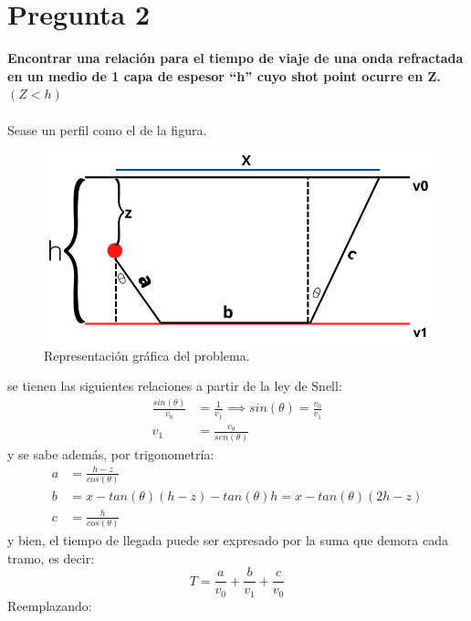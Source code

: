 \documentclass{article}
\theoremstyle{mytheoremstyle}
\theoremstyle{mytheoremstyle}
\theoremstyle{myproblemstyle}
\begin{document}
\section*{Pregunta 2}
\textbf{Encontrar una relación para el tiempo de viaje de una onda refractada en un medio de 1 capa
de espesor “h” cuyo shot point ocurre en Z.$(Z<h)$}\\ \\
Sease un perfil como el de la figura.\par 
\begin{figure}[h]
	\centering
	\includegraphics[width=\textwidth]{h.png}
	\caption{Representación gráfica del problema.}
\end{figure}
se tienen las siguientes relaciones a partir de la ley de Snell:
\begin{align*}
	\frac{sin(\theta)}{v_0}&=\frac{1}{v_1} \implies sin(\theta)=\frac{v_0}{v_1}
	\\ v_1&=\frac{v_0}{sen(\theta )}
\end{align*}
y se sabe además, por trigonometría:
\begin{align*}
	a&=\frac{h-z}{cos(\theta )} \\
	b&= x-tan(\theta )(h-z)-tan(\theta)h=x-tan(\theta )(2h -z) \\
	c&=\frac{h}{cos(\theta )}
\end{align*}
y bien, el tiempo de llegada puede ser expresado por la suma que demora cada tramo, es decir:
\begin{equation*}
	T=\frac{a}{v_0}+\frac{b}{v_1}+\frac{c}{v_0}
\end{equation*}
Reemplazando:
\end{document}
